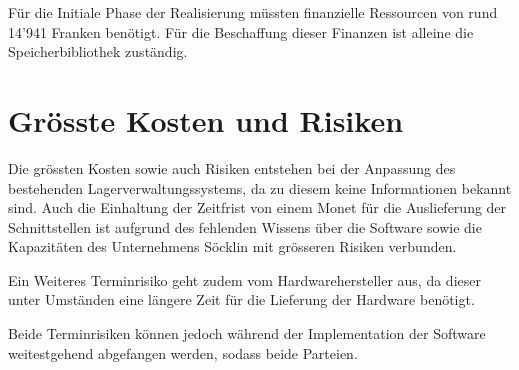 Für die Initiale Phase der Realisierung müssten finanzielle Ressourcen von rund 14'941 Franken benötigt. Für die Beschaffung dieser Finanzen ist alleine die Speicherbibliothek zuständig.


\section{Grösste Kosten und Risiken}
Die grössten Kosten sowie auch Risiken entstehen bei der Anpassung des bestehenden Lagerverwaltungssystems, da zu diesem keine Informationen bekannt sind. Auch die Einhaltung der Zeitfrist von einem Monet für die Auslieferung der Schnittstellen ist aufgrund des fehlenden Wissens über die Software sowie die Kapazitäten des Unternehmens Söcklin mit grösseren Risiken verbunden.

Ein Weiteres Terminrisiko geht zudem vom Hardwarehersteller aus, da dieser unter Umständen eine längere Zeit für die Lieferung der Hardware benötigt.

Beide Terminrisiken können jedoch während der Implementation der Software weitestgehend abgefangen werden, sodass beide Parteien.